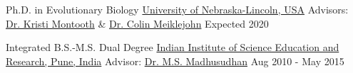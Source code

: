 

\begin{cventries}

  \eduentry
    {Ph.D. in Evolutionary Biology}  %
    {\href{https://biosci.unl.edu/}{University of Nebraska-Lincoln, USA}}  %
    {Advisors: \href{http://montoothlab.unl.edu/}{Dr. Kristi Montooth} \& \href{http://meiklejohnlab.unl.edu/}{Dr. Colin Meiklejohn}}  %
    {Expected 2020}  %

  \vspace{2.0mm} %

  \eduentry
    {Integrated B.S.-M.S. Dual Degree} %
    {\href{https://www.iiserpune.ac.in/}{Indian Institute of Science Education and Research, Pune, India}} %
    {Advisor: \href{http://cospi.iiserpune.ac.in/cospi/}{Dr. M.S. Madhusudhan}} %
    {Aug 2010 - May 2015} %

\end{cventries}

